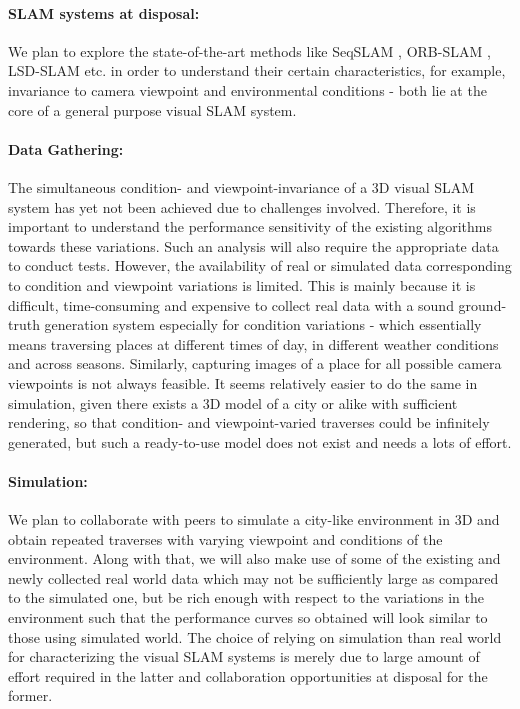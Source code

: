 \documentclass{article}
\begin{document}
\paragraph{SLAM systems at disposal:}We plan to explore the state-of-the-art methods like SeqSLAM \cite{Milford2012}, ORB-SLAM \cite{Mur-Artal2015}, LSD-SLAM \cite{Engel2014lsd} etc. in order to understand their certain characteristics, for example, invariance to camera viewpoint and environmental conditions - both lie at the core of a general purpose visual SLAM system.

\paragraph{Data Gathering:}The simultaneous condition- and viewpoint-invariance of a 3D visual SLAM system has yet not been achieved due to challenges involved. Therefore, it is important to understand the performance sensitivity of the existing algorithms towards these variations. Such an analysis will also require the appropriate data to conduct tests. However, the availability of real or simulated data corresponding to condition and viewpoint variations is limited. This is mainly because it is difficult, time-consuming and expensive to collect real data with a sound ground-truth generation system especially for condition variations - which essentially means traversing places at different times of day, in different weather conditions and across seasons. Similarly, capturing images of a place for all possible camera viewpoints is not always feasible. It seems relatively easier to do the same in simulation, given there exists a 3D model of a city or alike with sufficient rendering, so that condition- and viewpoint-varied traverses could be infinitely generated, but such a ready-to-use model does not exist and needs a lots of effort.

\paragraph{Simulation:}We plan to collaborate with peers to simulate a city-like environment in 3D and obtain repeated traverses with varying viewpoint and conditions of the environment. Along with that, we will also make use of some of the existing and newly collected real world data which may not be sufficiently large as compared to the simulated one, but be rich enough with respect to the variations in the environment such that the performance curves so obtained will look similar to those using simulated world. The choice of relying on simulation than real world for characterizing the visual SLAM systems is merely due to large amount of effort required in the latter and collaboration opportunities at disposal for the former. 
\end{document}
